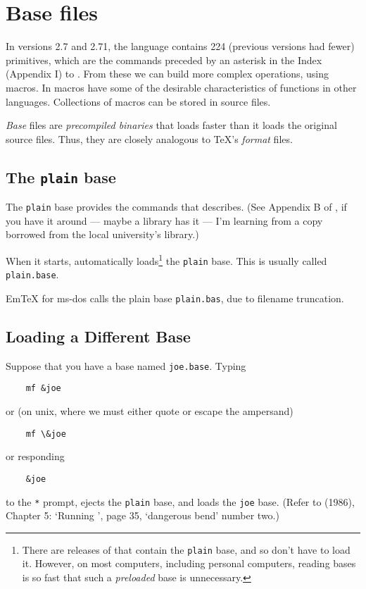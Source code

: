 \section{Base files}\label{sec:base}

In versions 2.7 and 2.71, the \MF{} language contains 224
(previous versions had fewer) primitives,
which are the commands preceded by an asterisk in the Index (Appendix I)
to \MFbook{}.  From these we can build more complex operations,
using macros.  In \MF{} macros have some of the desirable
characteristics of functions in other languages.  Collections of
macros can be stored in \MF{} source files.

{\em Base\/} files are {\em precompiled binaries} that \MF{}
loads faster than it loads the original \MF{} source files.
Thus, they are closely analogous to \TeX{}'s {\em format\/} files.


\subsection{The {\tt plain} base}\label{sub:plain}

The {\tt plain} base provides the commands that \MFbook{}
describes.  (See Appendix B of \MFbook{}, if you have it around
--- maybe a library has it --- I'm learning from a copy borrowed from the
local university's library.)

When it starts, \MF{} automatically loads\footnote
{There are releases of \MF{} that contain the {\tt plain} base,
and so don't have to load it.  However, on most computers, including
personal computers, reading bases is so fast that such a {\em preloaded}
base is unnecessary.}
the {\tt plain} base.
This is usually called {\tt plain.base}.

Em\TeX{} for {\sc ms-dos} calls the plain base {\tt plain.bas},
due to filename truncation.


\subsection{Loading a Different Base}\label{sub:loading}

Suppose that you have a base named {\tt joe.base}.
Typing
\begin{verbatim}
    mf &joe
\end{verbatim}
or (on unix, where we must either quote or escape the ampersand)
\begin{verbatim}
    mf \&joe
\end{verbatim}
or responding
\begin{verbatim}
    &joe
\end{verbatim}
to the {\tt **} prompt,
ejects the {\tt plain} base, and loads the {\tt joe} base.
(Refer to \MFbook{} (1986), Chapter 5: `Running \MF{}', page 35,
`dangerous bend' number two.)

